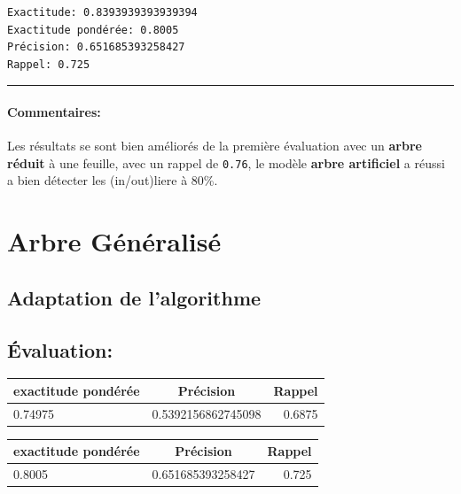 \documentclass[a4paper]{article}
\begin{document}
\begin{verbatim}
Exactitude: 0.8393939393939394
Exactitude pondérée: 0.8005
Précision: 0.651685393258427
Rappel: 0.725
\end{verbatim}

\begin{center}\rule{3in}{0.4pt}\end{center}

\paragraph{Commentaires:\\}\label{commentaires}

Les résultats se sont bien améliorés de la première évaluation avec un
\textbf{arbre réduit} à une feuille, avec un rappel de \texttt{0.76}, le
modèle \textbf{arbre artificiel} a réussi a bien détecter les
(in/out)liere à 80\%.\\

\newpage

\section{Arbre Généralisé}


\subsection{Adaptation de l'algorithme}

\subsection{Évaluation:}
\label{feuille-de-duxe9cision}

\begin{center}
   \begin{tabular}{ | l | c | r | }
     \hline
     exactitude pondérée & Précision  & Rappel \\ \hline
     0.74975 & 0.5392156862745098 &   0.6875  \\ \hline
   \end{tabular}
 \end{center}

\label{arbre-superficiel}

\begin{center}
   \begin{tabular}{ | l | c | r | }
     \hline
     exactitude pondérée & Précision  & Rappel \\ \hline
     0.8005 & 0.651685393258427 &    0.725  \\ \hline
   \end{tabular}
 \end{center}
\end{document}
